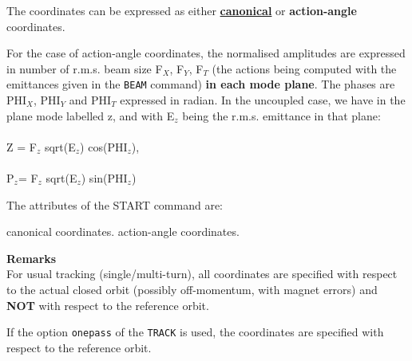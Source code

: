 The coordinates can be expressed as either
\href{../Introduction/tables.html#canon}{\textbf{canonical}}
or \textbf{action-angle} coordinates.

          
For the case of action-angle coordinates, the normalised amplitudes are
expressed in number of r.m.s. beam size F$_X$, F$_Y$, F$_T$ (the actions being computed with
the emittances given in the \texttt{BEAM} command) \textbf{in each mode
  plane}. The phases are PHI$_X$, PHI$_Y$ and PHI$_T$ expressed in
radian. In the uncoupled case, we have in the plane mode labelled z, and
with E$_z$ being the r.m.s. emittance in that plane:\\
\\
Z = F$_z$ sqrt(E$_z$) cos(PHI$_z$),    \\
\\
P$_z$= F$_z$ sqrt(E$_z$) sin(PHI$_z$)


The attributes of the START command are:
\begin{madlist}
   canonical coordinates. 
   action-angle coordinates.
\end{madlist}


{\bf Remarks} \\
For usual tracking (single/multi-turn), all coordinates are specified
with respect to the actual closed orbit (possibly off-momentum, with
magnet errors) and \textbf{NOT} with respect to the reference orbit.  

If the option \texttt{onepass} of the \texttt{TRACK} is used, the
coordinates are specified with respect to the reference orbit. 
            


